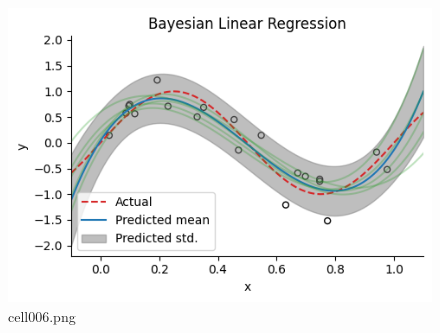 \begin{figure}[ht]
	\centering
	\includegraphics[scale=0.8, max width=\linewidth]{./fig/bayesian-brain/bayesian-linear-regression/cell006.png}
	\caption{cell006.png}
	\label{cell006.png}
\end{figure}